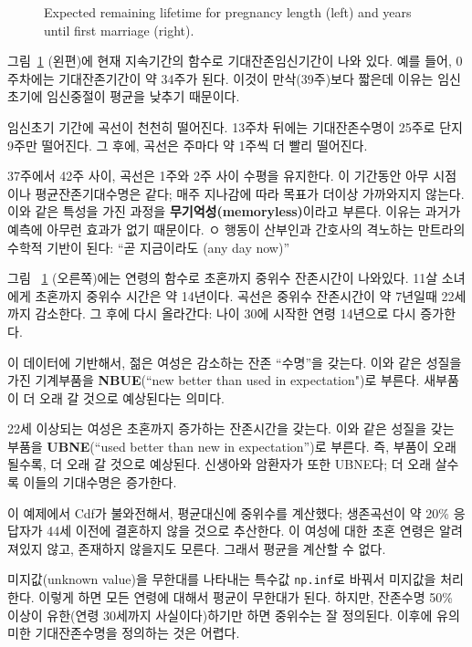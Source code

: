 \begin{figure}
\caption{Expected remaining lifetime for pregnancy length (left) and
years until first marriage (right).}
\label{survival6}
\end{figure}

그림~\ref{survival6} (왼편)에 현재 지속기간의 함수로 기대잔존임신기간이 나와 있다. 예를 들어, 0주차에는 기대잔존기간이 약 34주가 된다.
이것이 만삭(39주)보다 짧은데 이유는 임신 초기에 임신중절이 평균을 낮추기 때문이다. 

임신초기 기간에 곡선이 천천히 떨어진다. 13주차 뒤에는 기대잔존수명이 25주로 단지 9주만  떨어진다. 그 후에, 곡선은 주마다 약 1주씩 더 빨리 떨어진다. 

37주에서 42주 사이, 곡선은 1주와 2주 사이 수평을 유지한다. 이 기간동안 아무 시점이나 평균잔존기대수명은 같다; 매주 지나감에 따라 목표가 더이상 가까와지지 않는다. 이와 같은 특성을 가진 과정을 {\bf 무기억성(memoryless)}이라고 부른다. 이유는 과거가 예측에 아무런 효과가 없기 때문이다. 
ㅇ 행동이 산부인과 간호사의 격노하는 만트라의 수학적 기반이 된다: ``곧 지금이라도 (any day now)''

그림 ~\ref{survival6} (오른쪽)에는 연령의 함수로 초혼까지 중위수 잔존시간이 나와있다. 11살 소녀에게 초혼까지 중위수 시간은 약 14년이다. 곡선은 중위수 잔존시간이 약 7년일때 22세까지 감소한다.
그 후에 다시 올라간다: 나이 30에 시작한 연령 14년으로 다시 증가한다.

이 데이터에 기반해서, 젊은 여성은 감소하는 잔존 ``수명''을 갖는다.
이와 같은 성질을 가진 기계부품을 {\bf NBUE}(``new better than used in expectation")로 부른다. 새부품이 더 오래 갈 것으로 예상된다는 의미다.

22세 이상되는 여성은 초혼까지 증가하는 잔존시간을 갖는다.
이와 같은 성질을 갖는 부품을 {\bf UBNE}(``used better than new in expectation'')로 부른다. 즉, 부품이 오래될수록, 더 오래 갈 것으로 예상된다. 신생아와 암환자가 또한 UBNE다; 더 오래 살수록 이들의 기대수명은 증가한다.

이 예제에서 Cdf가 불와전해서, 평균대신에 중위수를 계산했다; 
생존곡선이 약 20\% 응답자가 44세 이전에 결혼하지 않을 것으로 추산한다. 이 여성에 대한 초혼 연령은 알려져있지 않고, 존재하지 않을지도 모른다. 그래서 평균을 계산할 수 없다.


미지값(unknown value)을 무한대를 나타내는 특수값 {\tt np.inf}로 바꿔서 미지값을 처리한다. 이렇게 하면 모든 연령에 대해서 평균이 무한대가 된다.
하지만, 잔존수명 50\% 이상이 유한(연령 30세까지 사실이다)하기만 하면 중위수는 잘 정의된다. 이후에 유의미한 기대잔존수명을 정의하는 것은 어렵다.

